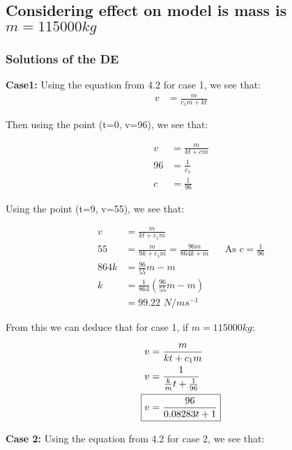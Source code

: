 \subsection{Considering effect on model is mass is $m=115000kg$}

\subsubsection{Solutions of the DE}
\textbf{Case1: }
Using the equation from 4.2 for case 1, we see that:
\begin{align*}
    v &= \frac{m}{c_{1}m+kt}
\end{align*}

Then using the point (t=0, v=96), we see that:
\begin{center}
\begin{align*}
    v &= \frac{m}{kt+cm}
    \\ 96 &= \frac{1}{c_1}
    \\ c &= \frac{1}{96}
\end{align*}
\end{center}
Using the point (t=9, v=55), we see that:
\begin{center}
\begin{align*}
    v &= \frac{m}{kt+c_1m}
    \\ 55 &= \frac{m}{9k + c_1m} = \frac{96m}{864k + m} && \text{As $c=\frac{1}{96}$}
    \\ 864k &= \frac{96}{55}m - m
    \\ k &= \frac{1}{864}(\frac{96}{55}m - m)
    \\ &= \text{99.22 $N/ms^{-1}$}
\end{align*}
\end{center}
From this we can deduce that for case 1, if $m=115000kg$:
\begin{center}
\begin{align*}
    v &= \frac{m}{kt+c_{1}m}
    \\ v &= \frac{1}{\frac{k}{m}t+\frac{1}{96}}
    \\ \Aboxed{v &= \frac{96}{0.08283t + 1}}
\end{align*}
\end{center}

\textbf{Case 2: } 
Using the equation from 4.2 for case 2, we see that:

